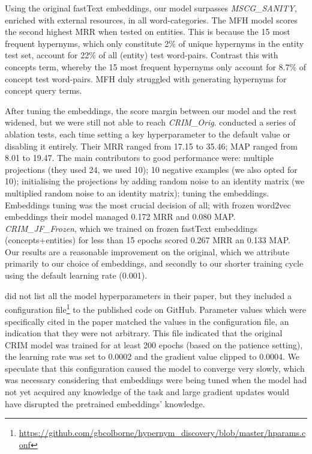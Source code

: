 Using the original fastText embeddings, our model surpasses \textit{MSCG\_SANITY}, enriched with external resources, in all word-categories.  The \ac{MFH} model scores the second highest \ac{MRR} when tested on entities.  This is because the 15 most frequent hypernyms, which only constitute  2\% of unique hypernyms in the entity test set, account for 22\% of all (entity) test word-pairs.  Contrast this with concepts term,  whereby the 15 most frequent hypernyms only account for 8.7\% of concept test word-pairs.  \ac{MFH} duly struggled with generating hypernyms for concept query terms.

After tuning the embeddings, the score margin between our model and the rest widened, but we were still not able to reach \textit{CRIM\_Orig}.  \citeauthor{bernier2018crim} conducted a series of ablation tests, each time setting a key hyperparameter to the default value or disabling it entirely.  Their \ac{MRR} ranged from 17.15 to 35.46; \ac{MAP} ranged from 8.01 to 19.47.  The main contributors to good performance were: multiple projections (they used 24, we used 10); 10 negative examples (we also opted for 10); initialising the projections by adding random noise to an identity matrix (we multiplied random noise to an identity matrix); tuning the embeddings.  Embeddings tuning was the most crucial decision of all; with frozen word2vec embeddings their model managed 0.172 \ac{MRR} and 0.080 \ac{MAP}.  \textit{CRIM\_JF\_Frozen}, which we trained on frozen fastText embeddings (concepts+entities) for less than 15 epochs scored 0.267 \ac{MRR} an 0.133 \ac{MAP}.  Our results are a reasonable improvement on the original, which we attribute primarily to our choice of embeddings, and secondly to our shorter training cycle using the default learning rate (0.001).

\citeauthor{bernier2018crim} did not list all the model hyperparameters in their paper, but they included a configuration file\footnote{\url{https://github.com/gbcolborne/hypernym_discovery/blob/master/hparams.conf}}  to the published code on GitHub.  Parameter values which were specifically cited in the paper matched the values in the configuration file, an indication that they were not arbitrary.  This file indicated that the original CRIM model was trained for at least 200 epochs (based on the patience setting), the learning rate was set to 0.0002 and the gradient value clipped to 0.0004.  We speculate that this configuration caused the model to converge very slowly, which was necessary considering that embeddings were being tuned when the model had not yet acquired any knowledge of the task and large gradient updates would have disrupted the pretrained embeddings' knowledge.

